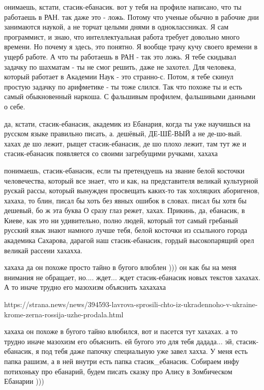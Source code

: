 онимаешь, кстати, стасик-ебанасик. вот у тебя на профиле написано, что ты
работаешь в РАН. так даже это - ложь. Потому что ученые обычно в рабочие дни
занимаются наукой, а не торчат целыми днями в одноклассниках. Я сам
программист, и знаю, что интеллектуальная работа требует довольно много
времени. Но почему я здесь, это понятно. Я вообще трачу кучу своего времени в
ущерб работе. А что ты работаешь в РАН - так это ложь. Я тебе скидывал задачку
по шахматам - ты не смог решить, даже не захотел. Для человека, который
работает в Академии Наук - это странно-с. Потом, я тебе скинул простую задачку
по арифметике - ты тоже слился. Так что похоже ты и есть самый обыкновенный
наркоша. С фальшивым профилем, фальшивыми данными о себе.

да, кстати, стасик-ебанасик, академик из Ебанария, когда ты уже научишься на
русском языке правильно писать, а.  дешёвый, ДЕ-ШЁ-ВЫЙ а не де-шо-вый. хахах де
шо лежит, рыщет стасик-ебанасик, де шо плохо лежит, там тут же и
стасик-ебанасик появляется со своими загребущими ручками, хахаха

понимаешь, стасик-ебанасик, если ты претендуешь на звание белой косточки
человечества, который все знает, что и как, на представителя великай культурной
рускай рассы, который вынужден просвещать каких-то так хохляцких аборигенов,
хахаха, то блин, писал бы хоть без явных ошибок в словах. писал бы хотя бы
дешевый, бо ж эта буква О сразу глаз режет, хахах. Прикинь, да, ебанасик, в
Киеве, как это ни удивительно, полно людей, который тот самый гребаный русский
язык знают намного лучше тебя, белой косточки из ссыльного города академика
Сахарова, дарагой наш стасик-ебанасик, гордый высокопарящий орел великай
рассеии хахахха.

хахаха да он похоже просто тайно в бугого влюблен ))) он как бы на меня
внимания не обращает, но.... ждет... ждет стасик-ебанасик новых текстов
хахахах. А то иначе трудно его мазохизм объяснить хахахаха

https://strana.news/news/394593-lavrova-sprosili-chto-iz-ukradennoho-v-ukraine-krome-zerna-rossija-uzhe-prodala.html

хахаха он похоже в бугого тайно влюбился, вот и пасется тут хахахах. а то
трудно иначе мазохизм его объяснить. ей бугого это для тебя дадада... эй,
стасик-ебанасик, я под тебя даже папочку специальную уже завел хахха. У меня
есть папка рашизм, а в ней внутри есть папка стасик_ебанасик. Собираем инфу
потихоньку про ебанарий, будем писать сказку про Алису в Зомбическом Ебанарии
)))
